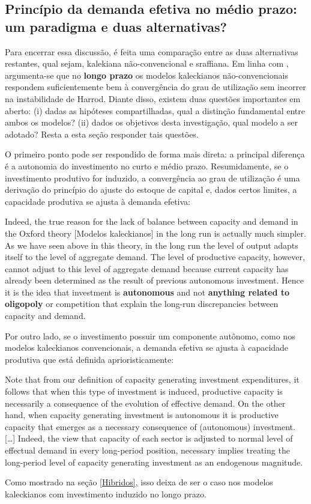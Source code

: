 \subsection{Princípio da demanda efetiva no médio prazo: um paradigma e duas alternativas?}
\label{Medium}


Para encerrar essa discussão, é feita uma comparação entre as duas alternativas restantes, qual sejam, kalekiana não-convencional e sraffiana. Em linha com \textcite{fagundes_role_2017}, argumenta-se que no \textbf{longo prazo} os modelos kaleckianos não-convencionais respondem suficientemente bem à convergência do grau de utilização sem incorrer na instabilidade de Harrod. Diante disso, existem duas questões importantes em aberto: (i) dadas as hipóteses compartilhadas, qual a distinção fundamental entre ambos os modelos? (ii) dados os objetivos desta investigação, qual modelo a ser adotado? Resta a esta seção responder tais questões.


O primeiro ponto pode ser respondido de forma mais direta: a principal diferença é a autonomia do investimento no curto e médio prazo.  Resumidamente, se o investimento produtivo for induzido, a convergência ao grau de utilização é uma derivação do princípio do ajuste do estoque de capital e, dados certos limites, a capacidade produtiva se ajusta à demanda efetiva:
\begin{citacao}
	Indeed, the true reason for the lack of balance between capacity and demand in the Oxford theory [Modelos kaleckianos] in the long run is actually much simpler. As we have seen above in this theory, in the long run the level of output adapts itself to the level of aggregate demand. The level of productive capacity, however, cannot adjust to this level of aggregate demand because current capacity has already been determined as the result of previous autonomous investment. Hence it is the idea that investment is \textbf{autonomous} and not \textbf{anything related to oligopoly} or competition that explain the long-run discrepancies between capacity and demand.
\end{citacao}
Por outro lado, se o investimento possuir um componente autônomo, como nos modelos kaleckianos convencionais, a demanda efetiva se ajusta à capacidade produtiva que está definida aprioristicamente:
\begin{citacao}
	Note that from our definition of capacity generating investment expenditures, it follows that when this type of investment is induced, productive capacity is necessarily a consequence of the evolution of effective demand. On the other hand, when capacity generating investment is autonomous it is productive capacity that emerges as a necessary consequence of (autonomous) investment. […] Indeed, the view that capacity of each sector is adjusted to normal level of effectual demand in every long-period position, necessary implies treating the long-period level of capacity generating investment as an endogenous magnitude. \cite[p.~77]{serrano_sraffian_1995}
\end{citacao}
Como mostrado na seção \ref{Hibridos}, isso deixa de ser o caso nos modelos kaleckianos com investimento induzido no longo prazo.

